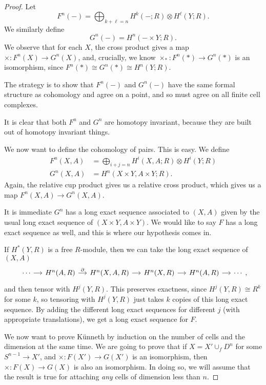 \documentclass[a4paper]{article}
\begin{document}
\begin{proof}
  Let
  \[
    F^n(-) = \bigoplus_{k + \ell = n} H^k(-; R) \otimes H^\ell(Y; R).
  \]
  We similarly define
  \[
    G^n(-) = H^n(-\times Y; R).
  \]
  We observe that for each $X$, the cross product gives a map $\times: F^n(X) \to G^n(X)$, and, crucially, we know $\times_*: F^n(*) \to G^n(*)$ is an isomorphism, since $F^n(*) \cong G^n(*) \cong H^n(Y; R)$.

  The strategy is to show that $F^n(-)$ and $G^n(-)$ have the same formal structure as cohomology and agree on a point, and so must agree on all finite cell complexes.

  \separator

  It is clear that both $F^n$ and $G^n$ are homotopy invariant, because they are built out of homotopy invariant things.

  \separator

  We now want to define the cohomology of pairs. This is easy. We define
  \begin{align*}
    F^n(X, A) &= \bigoplus_{i + j = n} H^i(X, A; R) \otimes H^i(Y; R)\\
    G^n(X, A) &= H^n(X \times Y, A \times Y; R).
  \end{align*}
  Again, the relative cup product gives us a relative cross product, which gives us a map $F^n(X, A) \to G^n(X, A)$.

  It is immediate $G^n$ has a long exact sequence associated to $(X, A)$ given by the usual long exact sequence of $(X \times Y, A \times Y)$. We would like to say $F$ has a long exact sequence as well, and this is where our hypothesis comes in.

  If $H^*(Y, R)$ is a free $R$-module, then we can take the long exact sequence of $(X, A)$
  \[
    \begin{tikzcd}[column sep=small]
      \cdots \ar[r] & H^n(A, R) \ar[r, "\partial"] & H^n(X , A , R) \ar[r] & H^n(X , R) \ar[r] & H^n(A , R) \ar[r] & \cdots
    \end{tikzcd},
  \]
  and then tensor with $H^j(Y, R)$. This preserves exactness, since $H^j(Y, R) \cong R^k$ for some $k$, so tensoring with $H^j(Y, R)$ just takes $k$ copies of this long exact sequence. By adding the different long exact sequences for different $j$ (with appropriate translations), we get a long exact sequence for $F$.

  \separator

  We now want to prove K\"unneth by induction on the number of cells and the dimension at the same time. We are going to prove that if $X = X' \cup_f D^n$ for some $S^{n - 1} \to X'$, and $\times: F(X') \to G(X')$ is an isomorphism, then $\times: F(X) \to G(X)$ is also an isomorphism. In doing so, we will assume that the result is true for attaching \emph{any} cells of dimension less than $n$.


\end{proof}
\end{document}
